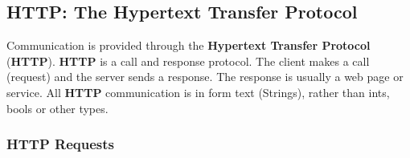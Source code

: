 \documentclass[11pt]{article}
\begin{document}
\subsection{HTTP: The Hypertext Transfer Protocol}
\label{http}

Communication is provided through the \textbf{Hypertext Transfer Protocol} (\textbf{HTTP}). \textbf{HTTP} is a call and response protocol. The client makes a call (request) and the server sends a response. The response is usually a web page or service. All \textbf{HTTP} communication is in form text (Strings), rather than ints, bools or other types.

\subsubsection{HTTP Requests}
\end{document}
